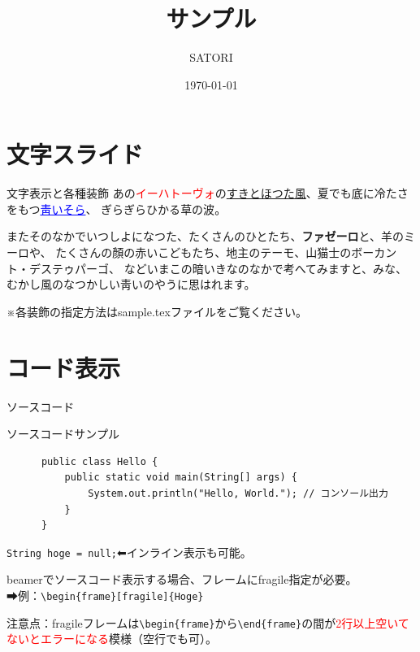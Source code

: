 \documentclass[
    aspectratio=169,   %
    xcolor={           %
        rgb,           %
        svgnames},     %
    unicode,           %
    12pt,              %
    unknownkeysallowed %
]{beamer}
\title{サンプル}
\author{SATORI}
\date{\today}
\begin{document}
\begin{frame}[plain,b]
  \titlepage
\end{frame}


\section{文字スライド}

\begin{frame}[fragile]{文字表示と各種装飾}
  あの\textcolor{red}{イーハトーヴォ}の\underline{すきとほつた風}、夏でも底に冷たさをもつ\textcolor{blue}{\underline{\textcolor{modernDarkBlue}{靑いそら}}}、
  ぎらぎらひかる{\large 草の波}。\par
  またそのなかでいつしよになつた、たくさんのひとたち、\textbf{ファゼーロ}と、羊のミーロや、
  たくさんの顏の赤いこどもたち、地主のテーモ、山猫士の{\scriptsize ボーカント・デステゥパーゴ}、
  などいまこの暗いきなのなかで考へてみますと、みな、むかし風のなつかしい靑いのやうに思はれます。

  ※各装飾の指定方法はsample.texファイルをご覧ください。
\end{frame}

\section{コード表示}

\begin{frame}[fragile]{ソースコード}
  \begin{block}{ソースコードサンプル}
    \begin{lstlisting}
      public class Hello {
          public static void main(String[] args) {
              System.out.println("Hello, World."); // コンソール出力
          }
      }
    \end{lstlisting}
  \end{block}

  \lstinline{String hoge = null;}⬅インライン表示も可能。

  beamerでソースコード表示する場合、フレームにfragile指定が必要。\\
  ➡例：\lstinline|\begin{frame}[fragile]{Hoge}|

  注意点：fragileフレームは\lstinline|\begin{frame}|から\lstinline|\end{frame}|の間が\textcolor{red}{2行以上空いてないとエラーになる}模様（空行でも可）。
\end{frame}
\end{document}
